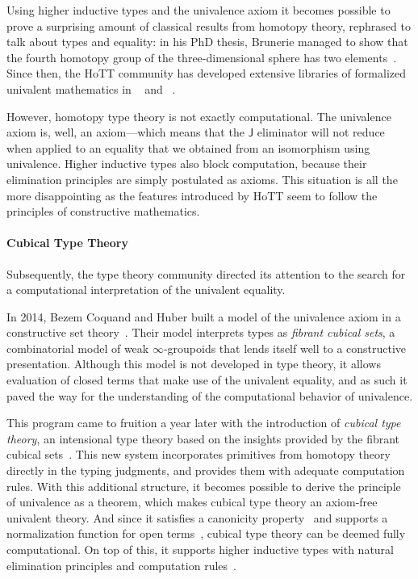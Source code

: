 Using higher inductive types and the univalence axiom it becomes possible to 
prove a surprising amount of classical results from homotopy theory, rephrased
to talk about types and equality:
% 
in his PhD thesis, Brunerie managed to show that the fourth homotopy group of
the three-dimensional sphere has two elements~.
% 
Since then, the HoTT community has developed extensive libraries of formalized
univalent mathematics in \Coq~ and
\Agda~.

However, homotopy type theory is not exactly computational. The univalence
axiom is, well, an axiom---which means that the \( \mathsf{J} \) eliminator
will not reduce when applied to an equality that we obtained from an 
isomorphism using univalence.
% 
Higher inductive types also block computation, because their elimination 
principles are simply postulated as axioms.
% 
This situation is all the more disappointing as the features introduced by HoTT
seem to follow the principles of constructive mathematics.

\paragraph*{Cubical Type Theory}
% 
Subsequently, the type theory community directed its attention to the
search for a computational interpretation of the univalent equality. 

In 2014, Bezem Coquand and Huber built a model of the univalence axiom in a constructive 
set theory~.
% 
Their model interprets types as \emph{fibrant cubical sets}, a combinatorial
model of weak \( \infty \)-groupoids that lends itself well to a constructive
presentation.
% 
Although this model is not developed in type theory, it allows evaluation of
closed terms that make use of the univalent equality, and as such it paved the 
way for the understanding of the computational behavior of univalence.

This program came to fruition a year later with the introduction of 
\emph{cubical type theory}, an intensional type theory based on the insights 
provided by the fibrant cubical sets~.
% 
This new system incorporates primitives from homotopy theory directly in the typing 
judgments, and provides them with adequate computation rules.
% 
With this additional structure, it becomes possible to derive the principle of 
univalence as a theorem, which makes cubical type theory an axiom-free univalent 
theory.
% 
And since it satisfies a canonicity property~ and supports a
normalization function for open terms~, 
cubical type theory can be deemed fully computational.
% 
On top of this, it supports higher inductive types with
natural elimination principles and computation rules~.

